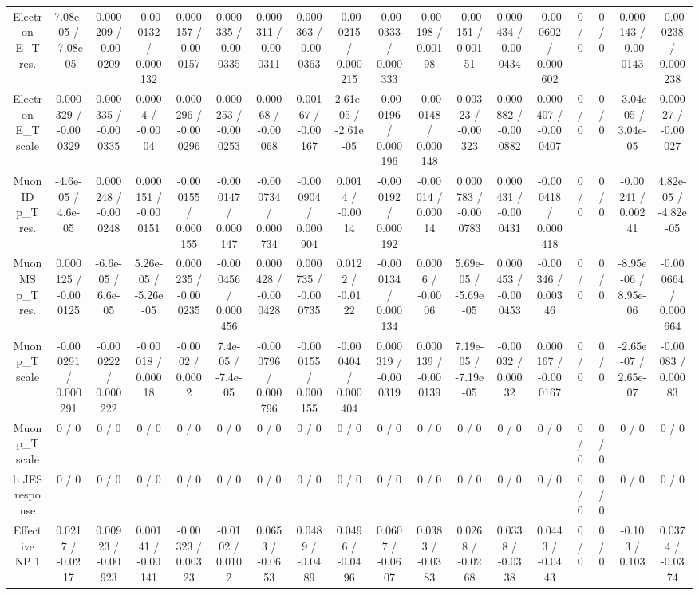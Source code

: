 \documentclass[10pt]{article}
\begin{document}
\begin{table}[htbp]
\begin{center}
\begin{tabular}{|c|c|c|c|c|c|c|c|c|c|c|c|c|c|c|c|c|c|}
  Electron E_{T} res. & 7.08e-05 / -7.08e-05 & 0.000209 / -0.000209 & -0.000132 / 0.000132 & 0.000157 / -0.000157 & 0.000335 / -0.000335 & 0.000311 / -0.000311 & 0.000363 / -0.000363 & -0.000215 / 0.000215 & -0.000333 / 0.000333 & -0.00198 / 0.00198 & -0.00151 / 0.00151 & 0.000434 / -0.000434 & -0.000602 / 0.000602 & 0 / 0 & 0 / 0 & 0.000143 / -0.000143 & -0.000238 / 0.000238 \\ 
  Electron E_{T} scale & 0.000329 / -0.000329 & 0.000335 / -0.000335 & 0.0004 / -0.0004 & 0.000296 / -0.000296 & 0.000253 / -0.000253 & 0.00068 / -0.00068 & 0.00167 / -0.00167 & 2.61e-05 / -2.61e-05 & -0.000196 / 0.000196 & -0.000148 / 0.000148 & 0.00323 / -0.00323 & 0.000882 / -0.000882 & 0.000407 / -0.000407 & 0 / 0 & 0 / 0 & -3.04e-05 / 3.04e-05 & 0.00027 / -0.00027 \\ 
  Muon ID p_{T} res. & -4.6e-05 / 4.6e-05 & 0.000248 / -0.000248 & 0.000151 / -0.000151 & -0.000155 / 0.000155 & -0.000147 / 0.000147 & -0.000734 / 0.000734 & -0.000904 / 0.000904 & 0.0014 / -0.0014 & -0.000192 / 0.000192 & -0.00014 / 0.00014 & 0.000783 / -0.000783 & 0.000431 / -0.000431 & -0.000418 / 0.000418 & 0 / 0 & 0 / 0 & -0.00241 / 0.00241 & 4.82e-05 / -4.82e-05 \\ 
  Muon MS p_{T} res. & 0.000125 / -0.000125 & -6.6e-05 / 6.6e-05 & 5.26e-05 / -5.26e-05 & 0.000235 / -0.000235 & -0.000456 / 0.000456 & 0.000428 / -0.000428 & 0.000735 / -0.000735 & 0.0122 / -0.0122 & -0.000134 / 0.000134 & 0.0006 / -0.0006 & 5.69e-05 / -5.69e-05 & 0.000453 / -0.000453 & -0.00346 / 0.00346 & 0 / 0 & 0 / 0 & -8.95e-06 / 8.95e-06 & -0.000664 / 0.000664 \\ 
  Muon p_{T} scale & -0.000291 / 0.000291 & -0.000222 / 0.000222 & -0.00018 / 0.00018 & -0.0002 / 0.0002 & 7.4e-05 / -7.4e-05 & -0.000796 / 0.000796 & -0.000155 / 0.000155 & -0.000404 / 0.000404 & 0.000319 / -0.000319 & 0.000139 / -0.000139 & 7.19e-05 / -7.19e-05 & -0.00032 / 0.00032 & 0.000167 / -0.000167 & 0 / 0 & 0 / 0 & -2.65e-07 / 2.65e-07 & -0.00083 / 0.00083 \\ 
  Muon p_{T} scale & 0 / 0 & 0 / 0 & 0 / 0 & 0 / 0 & 0 / 0 & 0 / 0 & 0 / 0 & 0 / 0 & 0 / 0 & 0 / 0 & 0 / 0 & 0 / 0 & 0 / 0 & 0 / 0 & 0 / 0 & 0 / 0 & 0 / 0 \\ 
  b JES response & 0 / 0 & 0 / 0 & 0 / 0 & 0 / 0 & 0 / 0 & 0 / 0 & 0 / 0 & 0 / 0 & 0 / 0 & 0 / 0 & 0 / 0 & 0 / 0 & 0 / 0 & 0 / 0 & 0 / 0 & 0 / 0 & 0 / 0 \\ 
  Effective NP 1 & 0.0217 / -0.0217 & 0.00923 / -0.00923 & 0.00141 / -0.00141 & -0.00323 / 0.00323 & -0.0102 / 0.0102 & 0.0653 / -0.0653 & 0.0489 / -0.0489 & 0.0496 / -0.0496 & 0.0607 / -0.0607 & 0.0383 / -0.0383 & 0.0268 / -0.0268 & 0.0338 / -0.0338 & 0.0443 / -0.0443 & 0 / 0 & 0 / 0 & -0.103 / 0.103 & 0.0374 / -0.0374 \\ 

\end{tabular}
\end{center}
\end{table}
\end{document}
